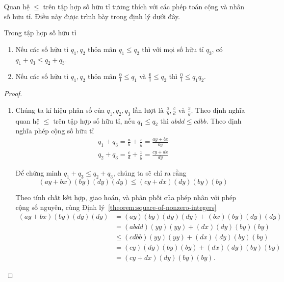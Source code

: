 Quan hệ $\leq$ trên tập hợp số hữu tỉ tương thích với các phép toán cộng và nhân số hữu tỉ. Điều này được trình bày trong định lý dưới đây.
\begin{theorem}\label{theorem:rational-numbers-order-and-operations}
	Trong tập hợp số hữu tỉ
	\begin{enumerate}[label={(\roman*)}]
		\item Nếu các số hữu tỉ $q_{1}, q_{2}$ thỏa mãn $q_{1}\leq q_{2}$ thì với mọi số hữu tỉ $q_{3}$, có $q_{1} + q_{3}\leq q_{2} + q_{3}$.
		\item Nếu các số hữu tỉ $q_{1}, q_{2}$ thỏa mãn $\frac{0}{1}\leq q_{1}$ và $\frac{0}{1}\leq q_{2}$ thì $\frac{0}{1}\leq q_{1}q_{2}$.
	\end{enumerate}
\end{theorem}

\begin{proof}
	\begin{enumerate}[label={(\roman*)}]
		\item Chúng ta kí hiệu phân số của $q_{1}, q_{2}, q_{3}$ lần lượt là $\frac{a}{b}, \frac{c}{d}$ và $\frac{x}{y}$. Theo định nghĩa quan hệ $\leq$ trên tập hợp số hữu tỉ, nếu $q_{1}\leq q_{2}$ thì $abdd\leq cdbb$. Theo định nghĩa phép cộng số hữu tỉ
		      \[
			      \begin{split}
				      q_{1} + q_{3} = \frac{a}{b} + \frac{x}{y} = \frac{ay + bx}{by} \\
				      q_{2} + q_{3} = \frac{c}{d} + \frac{x}{y} = \frac{cy + dx}{dy}
			      \end{split}
		      \]

		      Để chứng minh $q_{1} + q_{3}\leq q_{2} + q_{3}$, chúng ta sẽ chỉ ra rằng
		      \[
			      (ay + bx)(by)(dy)(dy)\leq (cy + dx)(dy)(by)(by)
		      \]

		      Theo tính chất kết hợp, giao hoán, và phân phối của phép nhân với phép cộng số nguyên, cùng Định lý~\ref{theorem:square-of-nonzero-integers}
		      \begin{align*}
			      (ay + bx)(by)(dy)(dy) & = (ay)(by)(dy)(dy) + (bx)(by)(dy)(dy)  \\
			                            & = (abdd)(yy)(yy) + (dx)(dy)(by)(by)    \\
			                            & \leq (cdbb)(yy)(yy) + (dx)(dy)(by)(by) \\
			                            & = (cy)(dy)(by)(by) + (dx)(dy)(by)(by)  \\
			                            & = (cy + dx)(dy)(by)(by).
		      \end{align*}


\end{enumerate}
\end{proof}
